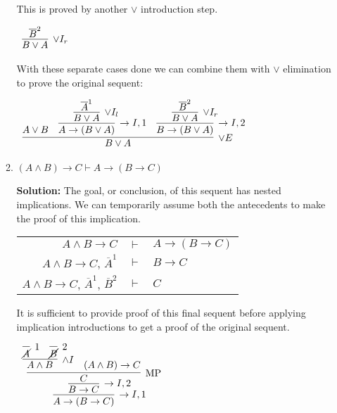 \documentclass[11pt]{report}
\newcommand{\temp}[2]{{\overline{#2}}^{#1}}
\begin{document}
\begin{enumerate}
\begin{enumerate}
		This is proved by another $\lor$ introduction step. 

		\begin{center}
			$\begin{array}{c}
				\infer[\lor I_{r}]{B \lor A}
					{\temp{2}{B}}
			\end{array}$
		\end{center}

		With these separate cases done we can combine them with $\lor$ elimination to prove the original sequent:

		\begin{center}
			$\begin{array}{c}
				\infer[\lor E]{B \lor A}
					{A \lor B
						&
						\infer[\to I,1]{A \to (B \lor A)}
							{\infer[\lor I_{l}]{B \lor A}
								{\temp{1}{A}}}
						&
						\infer[\to I,2]{B \to (B \lor A)}
							{\infer[\lor I_{r}]{B \lor A}
								{\temp{2}{B}}}}				
			\end{array}$

		\end{center}		
		
		\newpage
		\item $(A \land B) \rightarrow C \vdash  A\rightarrow (B \rightarrow C)$
		
		\vspace{5mm}
		\textbf{Solution:}
		The goal, or conclusion, of this sequent has nested implications. We can temporarily assume both the antecedents to make the proof of this implication. 

		\begin{center}
			\begin{tabular}{r c l}
				$A \land B \to C$ & $\vdash$ & $A \to (B \to C)$ \\
				$A \land B \to C$, $\temp{1}{A}$ & $\vdash$ & $B \to C$ \\
				$A \land B \to C$, $\temp{1}{A}$, $\temp{2}{B}$ & $\vdash$ & $C$ \\
			\end{tabular}
		\end{center}

		It is sufficient to provide proof of this final sequent before applying implication introductions to get a proof of the original sequent.

		\begin{center}
			$\begin{array}{c}
				\infer[\to I,1]{A \to (B \to C)}
					{\infer[\to I,2]{B \to C}
						{\infer[\MP]{C}
							{\infer[\land I]{A \land B}
								{\infer[1]{\cancel{A}}{} & \infer[2]{\cancel{B}}{}}
							&							
							(A \land B) \to C}}}
			\end{array}$
		\end{center}
		

\end{enumerate}
\end{enumerate}
\end{document}

